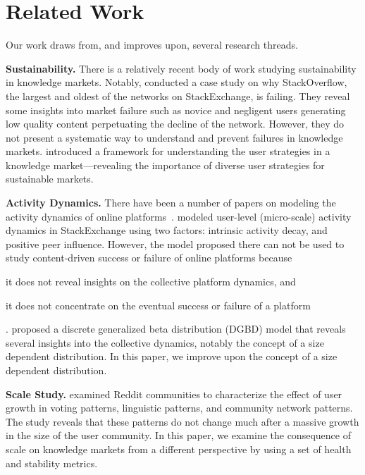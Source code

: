 \section{Related Work}
Our work draws from, and improves upon, several research threads.

\textbf{Sustainability.} There is a relatively recent body of work studying sustainability in knowledge markets. Notably, \citet{srba2016stack} conducted a case study on why StackOverflow, the largest and oldest of the networks on StackExchange, is failing. They reveal some insights into market failure such as novice and negligent users generating low quality content perpetuating the decline of the network. However, they do not present a systematic way to understand and prevent failures in knowledge markets. \citet{wu2016} introduced a framework for understanding the user strategies in a knowledge market---revealing the importance of diverse user strategies for sustainable markets. %

\textbf{Activity Dynamics.} There have been a number of papers on modeling the activity dynamics of online platforms~\cite{wu2011, anderson2012, walk2016}. \citet{walk2016} modeled user-level (micro-scale) activity dynamics in StackExchange using two factors: intrinsic activity decay, and positive peer influence. However, the model proposed there can not be used to study content-driven success or failure of online platforms because \begin{enumerate*}
    \item it does not reveal insights on the collective platform dynamics, and
\item it does not concentrate on the eventual success or failure of a platform\end{enumerate*}. \citet{wu2011} proposed a discrete generalized beta distribution (DGBD) model that reveals several insights into the collective dynamics, notably the concept of a size dependent distribution. In this paper, we improve upon the concept of a size dependent distribution.

\textbf{Scale Study.} \citet{lin2017} examined Reddit communities to characterize the effect of user growth in voting patterns, linguistic patterns, and community network patterns. The study reveals that these patterns do not change much after a massive growth in the size of the user community. In this paper, we examine the consequence of scale on knowledge markets from a different perspective by using a set of health and stability metrics.

